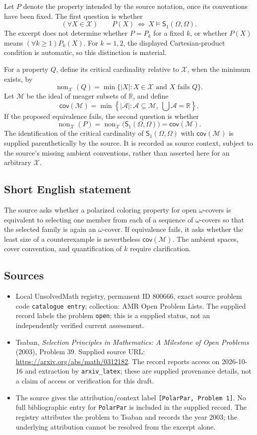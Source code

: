 \documentclass[11pt]{article}
\newcommand{\R}{\mathbb{R}}
\begin{document}
Let \(P\) denote the property intended by the source notation, once its conventions have been fixed. The first question is whether
\[
(\forall X\in\mathscr X)\qquad
P(X)\ \Longleftrightarrow\ X\models\mathsf S_1(\Omega,\Omega).
\]
The excerpt does not determine whether \(P=P_k\) for a fixed \(k\), or whether \(P(X)\) means \((\forall k\geq1)P_k(X)\). For \(k=1,2\), the displayed Cartesian-product condition is automatic, so this distinction is material.

For a property \(Q\), define its critical cardinality relative to \(\mathscr X\), when the minimum exists, by
\[
\operatorname{non}_{\mathscr X}(Q)
=\min\{|X|:X\in\mathscr X\text{ and }X\text{ fails }Q\}.
\]
Let \(\mathcal M\) be the ideal of meager subsets of \(\R\), and define
\[
\mathsf{cov}(\mathcal M)
=\min\left\{|\mathcal A|:\mathcal A\subseteq\mathcal M,
\ \bigcup\mathcal A=\R\right\}.
\]
If the proposed equivalence fails, the second question is whether
\[
\operatorname{non}_{\mathscr X}(P)
=\operatorname{non}_{\mathscr X}\bigl(\mathsf S_1(\Omega,\Omega)\bigr)
=\mathsf{cov}(\mathcal M).
\]
The identification of the critical cardinality of \(\mathsf S_1(\Omega,\Omega)\) with \(\mathsf{cov}(\mathcal M)\) is supplied parenthetically by the source. It is recorded as source context, subject to the source's missing ambient conventions, rather than asserted here for an arbitrary \(\mathscr X\).
\subsection{Short English statement}
The source asks whether a polarized coloring property for open \(\omega\)-covers is equivalent to selecting one member from each of a sequence of \(\omega\)-covers so that the selected family is again an \(\omega\)-cover. If equivalence fails, it asks whether the least size of a counterexample is nevertheless \(\mathsf{cov}(\mathcal M)\). The ambient spaces, cover convention, and quantification of \(k\) require clarification.
\subsection{Sources}
\begin{itemize}
\item Local UnsolvedMath registry, permanent ID \(800666\), exact source problem code \texttt{catalogue entry}; collection: AMR Open Problem Lists. The supplied record labels the problem \texttt{open}; this is a supplied status, not an independently verified current assessment.
\item Tsaban, \emph{Selection Principles in Mathematics: A Milestone of Open Problems} (2003), Problem 39. Supplied source URL: \url{https://arxiv.org/abs/math/0312182}. The record reports access on 2026-10-16 and extraction by \texttt{arxiv\_latex}; these are supplied provenance details, not a claim of access or verification for this draft.
\item The source gives the attribution/context label \texttt{[PolarPar, Problem 1]}. No full bibliographic entry for \texttt{PolarPar} is included in the supplied record. The registry attributes the problem to Tsaban and records the year 2003; the underlying attribution cannot be resolved from the excerpt alone.
\end{itemize}
\end{document}
